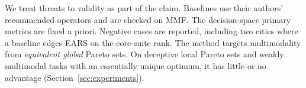 We treat threats to validity as part of the claim. Baselines use their authors' recommended
operators and are checked on MMF. The decision-space primary metrics are fixed a priori. Negative
cases are reported, including two cities where a baseline edges EARS on the core-suite rank.
The method targets multimodality from \emph{equivalent global} Pareto sets. On deceptive local
Pareto sets and weakly multimodal tasks with an essentially unique optimum, it has little or no
advantage (Section~\ref{sec:experiments}).
